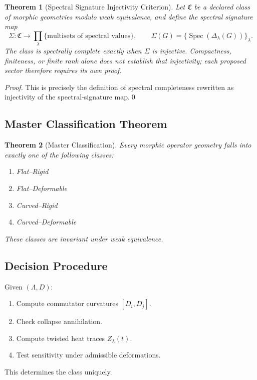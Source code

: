\documentclass[12pt, oneside]{article}
\newtheorem{theorem}{Theorem}[section]
\DeclareMathOperator{\Spec}{Spec}
\begin{document}
\begin{theorem}[Spectral Signature Injectivity Criterion]
Let $\mathfrak C$ be a declared class of morphic geometries modulo weak equivalence, and define the spectral signature map
\[
\Sigma:\mathfrak C\to \prod_{\lambda}\{\text{multisets of spectral values}\},
\qquad
\Sigma(G)=\{\Spec(\Delta_\lambda(G))\}_{\lambda}.
\]
The class is spectrally complete exactly when $\Sigma$ is injective. Compactness, finiteness, or finite rank alone does not establish that injectivity; each proposed sector therefore requires its own proof.
\end{theorem}

\begin{proof}
This is precisely the definition of spectral completeness rewritten as injectivity of the spectral-signature map.\qed
\end{proof}

\subsection{Master Classification Theorem}

\begin{theorem}[Master Classification]
Every morphic operator geometry falls into exactly one of the following classes:
\begin{enumerate}
    \item Flat--Rigid
    \item Flat--Deformable
    \item Curved--Rigid
    \item Curved--Deformable
\end{enumerate}
These classes are invariant under weak equivalence.
\end{theorem}

\subsection{Decision Procedure}

Given $(\Lambda, D)$:
\begin{enumerate}
    \item Compute commutator curvatures $[D_i, D_j]$.
    \item Check collapse annihilation.
    \item Compute twisted heat traces $Z_\lambda(t)$.
    \item Test sensitivity under admissible deformations.
\end{enumerate}
This determines the class uniquely.
\end{document}
